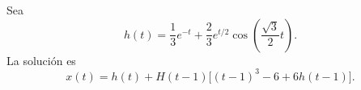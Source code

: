 Sea
\[h(t)=\frac13e^{-t}+\frac23e^{t/2}\cos\left(\frac{\sqrt3}{2}t\right).\]
La solución es
\[x(t)=h(t)+H(t-1)\big[(t-1)^3-6+6h(t-1)\big].\]
